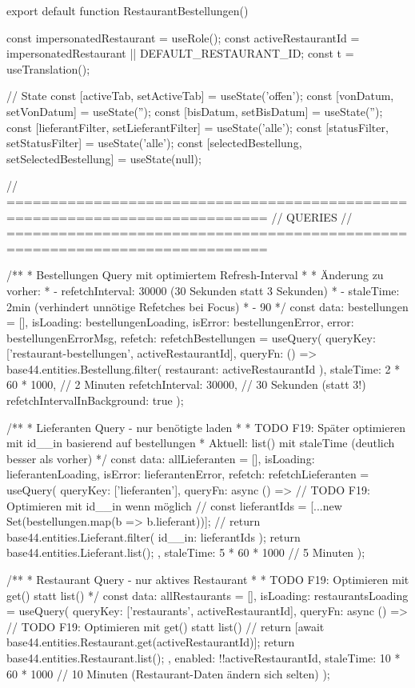 export default function RestaurantBestellungen() {
  const { impersonatedRestaurant } = useRole();
  const activeRestaurantId = impersonatedRestaurant || DEFAULT_RESTAURANT_ID;
  const { t } = useTranslation();

  // State
  const [activeTab, setActiveTab] = useState('offen');
  const [vonDatum, setVonDatum] = useState('');
  const [bisDatum, setBisDatum] = useState('');
  const [lieferantFilter, setLieferantFilter] = useState('alle');
  const [statusFilter, setStatusFilter] = useState('alle');
  const [selectedBestellung, setSelectedBestellung] = useState(null);

  // ============================================================================
  // QUERIES
  // ============================================================================

  /**
   * Bestellungen Query mit optimiertem Refresh-Interval
   * 
   * Änderung zu vorher:
   * - refetchInterval: 30000 (30 Sekunden statt 3 Sekunden)
   * - staleTime: 2min (verhindert unnötige Refetches bei Focus)
   * - 90%
   */
  const { 
    data: bestellungen = [], 
    isLoading: bestellungenLoading,
    isError: bestellungenError,
    error: bestellungenErrorMsg,
    refetch: refetchBestellungen
  } = useQuery({
    queryKey: ['restaurant-bestellungen', activeRestaurantId],
    queryFn: () => base44.entities.Bestellung.filter({ restaurant: activeRestaurantId }),
    staleTime: 2 * 60 * 1000, // 2 Minuten
    refetchInterval: 30000, // 30 Sekunden (statt 3!)
    refetchIntervalInBackground: true
  });

  /**
   * Lieferanten Query - nur benötigte laden
   * 
   * TODO F19: Später optimieren mit id__in basierend auf bestellungen
   * Aktuell: list() mit staleTime (deutlich besser als vorher)
   */
  const { 
    data: allLieferanten = [],
    isLoading: lieferantenLoading,
    isError: lieferantenError,
    refetch: refetchLieferanten
  } = useQuery({
    queryKey: ['lieferanten'],
    queryFn: async () => {
      // TODO F19: Optimieren mit id__in wenn möglich
      // const lieferantIds = [...new Set(bestellungen.map(b => b.lieferant))];
      // return base44.entities.Lieferant.filter({ id__in: lieferantIds });
      return base44.entities.Lieferant.list();
    },
    staleTime: 5 * 60 * 1000 // 5 Minuten
  });

  /**
   * Restaurant Query - nur aktives Restaurant
   * 
   * TODO F19: Optimieren mit get() statt list()
   */
  const { 
    data: allRestaurants = [],
    isLoading: restaurantsLoading 
  } = useQuery({
    queryKey: ['restaurants', activeRestaurantId],
    queryFn: async () => {
      // TODO F19: Optimieren mit get() statt list()
      // return [await base44.entities.Restaurant.get(activeRestaurantId)];
      return base44.entities.Restaurant.list();
    },
    enabled: !!activeRestaurantId,
    staleTime: 10 * 60 * 1000 // 10 Minuten (Restaurant-Daten ändern sich selten)
  });

}
